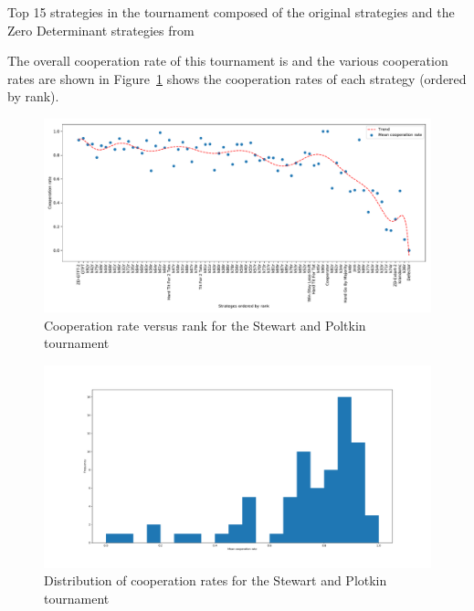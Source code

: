\documentclass{article}
\begin{document}
\begin{table}[!hbtp]
        \centering
        
        \caption{Top 15 strategies in the tournament composed of the original
                 strategies and the Zero Determinant strategies
                 from~\cite{Stewart2012}}
        \label{tbl:sp_tournament_rankings}
\end{table}

The overall cooperation rate of this tournament is
and the various
cooperation rates are shown in
Figure~\ref{fig:sp_tournament_cooperation_rate_versus_rank} shows the
cooperation rates of each strategy (ordered by rank).

\begin{figure}[!hbtp]
    \centering
    \includegraphics[width=.8\textwidth]{assets/sp_tournament_cooperation_rate_versus_rank.pdf}
    \caption{Cooperation rate versus rank for the Stewart and Poltkin tournament}
    \label{fig:sp_tournament_cooperation_rate_versus_rank}
\end{figure}


\begin{figure}[!hbtp]
    \centering
    \includegraphics[width=.8\textwidth]{assets/sp_tournament_cooperation_rates.pdf}
    \caption{Distribution of cooperation rates for the Stewart and Plotkin
    tournament}
    \label{fig:sp_tournament_cooperation_rates}
\end{figure}
\end{document}
